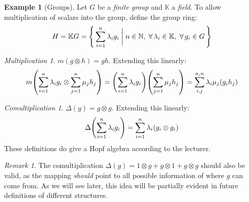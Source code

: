 \documentclass{article}
\theoremstyle{definition}
\newtheorem{Example}{Example}
\theoremstyle{remark}
\newtheorem*{Remark*}{Remark}
\theoremstyle{underline}
\newtheorem*{Multiplication*}{Multiplication}
\theoremstyle{underline}
\newtheorem*{Comultiplication*}{Comultiplication}
\begin{document}
\begin{Example}[Groups]
Let $G$ be a \emph{finite group} and $\mathbb{K}$ a \emph{field}. To allow multiplication of scalars into the group, define the group ring:
\begin{gather*}
	H = \mathbb KG = \qty{\, \sum_{i = 1}^n\lambda_i g_i \biggm| n \in \mathbb N,\; \forall\,\lambda_i \in \mathbb K,\; \forall\,g_i \in G \,}	
\end{gather*}

\begin{Multiplication*}
$m(g \otimes h) = gh$. Extending this linearly:
\begin{gather*}
	m\pqty{\sum_{i = 1}^{n}\lambda_i g_i \otimes \sum_{j = 1}^{n}\mu_j h_j} = \pqty{\sum_{i = 1}^{n}\lambda_i g_i}\pqty{\sum_{j = 1}^{n}\mu_j h_j} = \sum_{i,j}^{n,n} \lambda_i \mu_j(g_i h_j)
\end{gather*}
\end{Multiplication*}

\begin{Comultiplication*}
$ \Delta(g) = g \otimes g $. Extending this linearly:
\begin{gather*}
	\Delta\pqty{\sum_{i = 1}^n \lambda_ig_i} = \sum_{i = 1}^n \lambda_i(g_i \otimes g_i)
\end{gather*}
These definitions do give a Hopf algebra according to the lecturer. 	
\end{Comultiplication*}

\begin{Remark*}
The comultiplication $ \Delta(g) = 1 \otimes g + g \otimes 1 + g \otimes g$ should also be valid, as the mapping \emph{should} point to all possible information of where $g$ can come from. As we will see later, this idea will be partially evident in future definitions of different structures.
\end{Remark*}

\end{Example}
\end{document}
